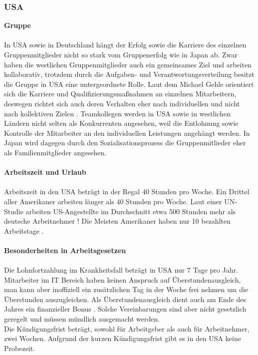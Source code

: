	\subsubsection{USA}
	\textbf{Gruppe}\\
	\\
	In USA sowie in Deutschland hängt der Erfolg sowie die Karriere des einzelnen Gruppenmitglieder nicht so stark vom Gruppenerfolg wie in Japan ab. Zwar haben die westlichen Gruppenmitglieder auch ein gemeinsames Ziel und arbeiten kollaborativ, trotzdem durch die Aufgaben- und Verantwortungsverteilung besitzt die Gruppe in USA eine untergeordnete Rolle. Laut dem Michael Gehle orientiert sich die  Karriere und Qualifizierungsmaßnahmen an einzelnen Mitarbeitern, deswegen richtet sich auch deren Verhalten eher nach individuellen und nicht nach kollektiven Zielen \cite[233]{3LaenderVergl}. 
	Teamkollegen werden in USA sowie in westlichen Ländern nicht selten als Konkurrenten angesehen, weil die Entlohnung sowie Kontrolle der Mitarbeiter an den individuellen Leistungen angehängt werden. In Japan wird dagegen durch den Sozialisationsprozess die Gruppenmitlieder eher als Familienmitglieder angesehen.\\
	 \\
		\textbf{Arbeitszeit und Urlaub}\\
		\\
	Arbeitszeit in den USA beträgt in der Regal 40 Stunden pro Woche. 
	Ein Drittel aller Amerikaner arbeiten länger als 40 Stunden pro Woche.
	Laut einer UN-Studie arbeiten US-Angestellte im Durchschnitt etwa 500 Stunden mehr als deutsche Arbeitnehmer \cite{ArbeitsumgUSA}! Die Meisten Amerikaner haben nur 10 bezahlten Arbeitstage \cite{InfoUSArbVertr}. 
	\\
	\\	\textbf{Besonderheiten in Arbeitsgesetzen}\\
		\\
		Die Lohnfortzahlung im Krankheitsfall beträgt in USA nur 7 Tage pro Jahr. 
		Mitarbeiter im IT Bereich haben keinen Anspruch auf Überstundenausgleich, man kann aber inoffiziell ein zusätzlichen Tag in der Woche frei nehmen um die Überstunden auszugleichen. Als Überstundenausgleich dient auch am Ende des Jahres ein finanzieller Bonus \cite{InfoUSArbVertr}.
		Solche Vereinbarungen sind aber nicht gesetzlich geregelt und müssen mündlich ausgemacht werden.\\
		Die Kündigungsfrist beträgt, sowohl für Arbeitgeber als auch für 
		Arbeitnehmer, zwei Wochen. Aufgrund der kurzen Kündigungsfrist gibt es in den USA keine Probezeit.\\
